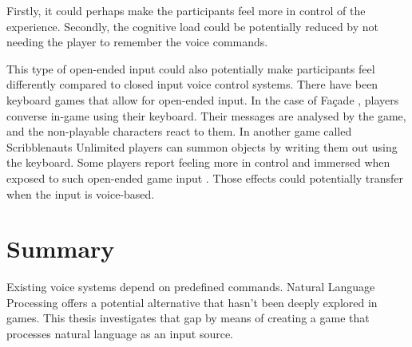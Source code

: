 Firstly, it could perhaps make the participants feel more in control of the experience. Secondly, the cognitive load could be potentially reduced by not needing the player to remember the voice commands.

This type of open-ended input could also potentially make participants feel differently compared to closed input voice control systems. There have been keyboard games that allow for open-ended input. In the case of Façade \parencite{proceduralartsFacade2005}, players converse in-game using their keyboard. Their messages are analysed by the game, and the non-playable characters react to them. In another game called Scribblenauts Unlimited \parencite{5thcellshiverentertainmentHuman2012} players can summon objects by writing them out using the keyboard.
Some players report feeling more in control and immersed when exposed to such open-ended game input \parencite{ScribblenautsUnlimitedSteam2026}. Those effects could potentially transfer when the input is voice-based.

\section{Summary}

Existing voice systems depend on predefined commands.
Natural Language Processing offers a potential alternative that hasn't been deeply explored in games. 
This thesis investigates that gap by means of creating a game that processes natural language as an input source.



